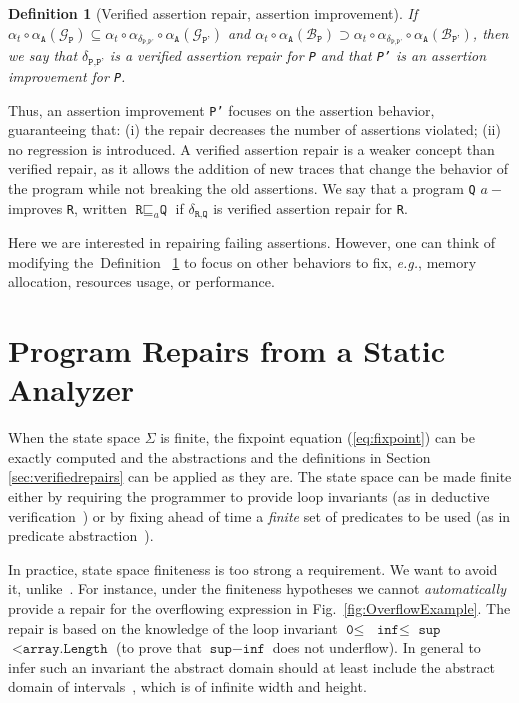 \documentclass[10pt]{sigplanconf}
\newtheorem{definition}{Definition}
\newcommand{\labelDef}[1]{\label{def:#1}}
\newcommand{\refFig}[1]{Fig.~\ref{fig:#1}}
\newcommand{\refDef}[1]{Definition ~\ref{def:#1}}
\newcommand{\code}[1]{\texttt{#1}}
\newcommand{\diff}[2]{\delta_{\code{#1}, \code{#2}}}
\begin{document}
\begin{definition}[Verified assertion repair, assert\-ion im\-prove\-ment]
\labelDef{AssertionRepair}
If $\alpha_{t} \circ \alpha_\code{A}(\mathcal{G}_\code{P}) \subseteq \alpha_{t} \circ \alpha_{\diff{P}{P'}} \circ\alpha_\code{A}(\mathcal{G}_\code{P'})$ and 
$\alpha_{t} \circ \alpha_\code{A}(\mathcal{B}_\code{P}) \supset \alpha_{t} \circ \alpha_{\diff{P}{P'}}\circ \alpha_\code{A}(\mathcal{B}_\code{P'})$, then we say that  $\diff{P}{P'}$ is a verified \emph{assertion} repair for \code{P} and that \code{P'} is an \emph{assertion} improvement for \code{P}.
\end{definition}

Thus, an assertion improvement \code{P'} focuses on the assertion
behavior, guaranteeing that: (i) the repair decreases the number of
assertions violated; (ii) no regression is introduced.  A verified
assertion repair is a weaker concept than verified repair, as it
allows the addition of new traces that change the behavior of the
program while not breaking the old assertions.  We say that a program
\code{Q} $a-$improves \code{R}, written $\code{R} \sqsubseteq_a \code{Q}$
if $\diff{R}{Q}$ is verified assertion repair for \code{R}.

Here we are interested in repairing failing assertions.
However, one can think of modifying the~\refDef{AssertionRepair}  to focus on other behaviors to fix, \emph{e.g.}, memory allocation, resources usage, or performance.

\section{Program Repairs from a Static Analyzer}
\label{sec:fromStaticAnalyzer}

When the state space $\Sigma$ is finite, the fixpoint equation (\ref{eq:fixpoint}) can be exactly computed and the abstractions and the definitions in Section \ref{sec:verifiedrepairs} can be applied as they are.
The state space can be made finite either by requiring the programmer to provide loop invariants (as in deductive verification~\cite{Hoare69}) or by fixing ahead of time a \emph{finite} set of predicates to be used (as in predicate abstraction~\cite{ClarkeEtAl00}).

In practice, state space finiteness is too strong a requirement.
We want to avoid it, unlike~\cite{SamantaEtAl08,GriesmayerEtAl06}.
For instance, under the finiteness hypotheses we cannot  \emph{automatically} provide a repair for the overflowing expression in \refFig{OverflowExample}.
The repair is based on the knowledge of the loop invariant $\code{0} \leq$ $\code{inf} \leq $ $\code{sup}$ $< \code{array.Length}$ (to prove that $\code{sup} - \code{inf}$ does not underflow).
In general to infer such an invariant the abstract domain should at least include the abstract domain of intervals~\cite{CousotCousot77}, which is of infinite width and height.
\end{document}
